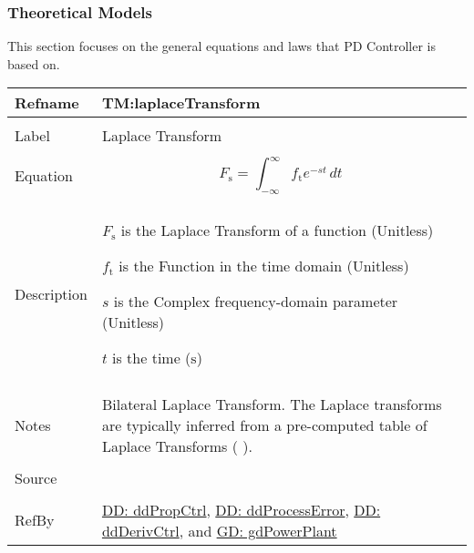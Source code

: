 \documentclass[12pt]{article}
\begin{document}
\subsubsection{Theoretical Models}
\label{Sec:TMs}
This section focuses on the general equations and laws that PD Controller is based on.

\vspace{\baselineskip}
\noindent
\begin{minipage}{\textwidth}
\begin{tabular}{>{\raggedright}p{}>{\raggedright\arraybackslash}p{}}
\toprule \textbf{Refname} & \textbf{TM:laplaceTransform}
\label{TM:laplaceTransform}
\\ \midrule \\
Label & Laplace Transform
        
\\ \midrule \\
Equation & \begin{displaymath}
           {F_{\text{s}}}=\int_{-∞}^{∞}{{f_{\text{t}}} e^{-s t}}\,dt
           \end{displaymath}
\\ \midrule \\
Description & \begin{symbDescription}
              \item{${F_{\text{s}}}$ is the Laplace Transform of a function (Unitless)}
              \item{${f_{\text{t}}}$ is the Function in the time domain (Unitless)}
              \item{$s$ is the Complex frequency-domain parameter (Unitless)}
              \item{$t$ is the time (${\text{s}}$)}
              \end{symbDescription}
\\ \midrule \\
Notes & Bilateral Laplace Transform. The Laplace transforms are  typically inferred from a pre-computed table of Laplace Transforms  ( \cite{laplaceWiki} ).
        
\\ \midrule \\
Source & \cite{laplaceWiki}
         
\\ \midrule \\
RefBy & \hyperref[DD:ddPropCtrl]{DD: ddPropCtrl}, \hyperref[DD:ddProcessError]{DD: ddProcessError}, \hyperref[DD:ddDerivCtrl]{DD: ddDerivCtrl}, and \hyperref[GD:gdPowerPlant]{GD: gdPowerPlant}
        
\\ \bottomrule
\end{tabular}
\end{minipage}
\end{document}
